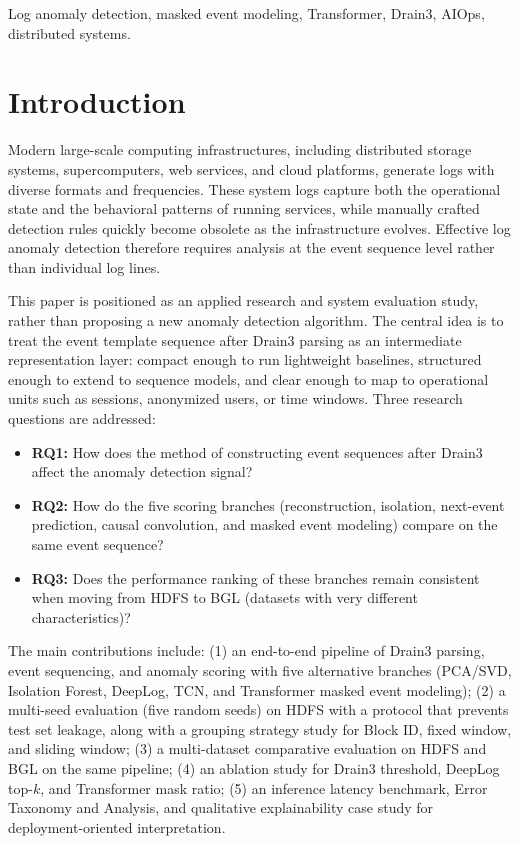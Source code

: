\documentclass[conference]{IEEEtran}
\begin{document}
\begin{IEEEkeywords}
Log anomaly detection, masked event modeling, Transformer, Drain3, AIOps, distributed systems.
\end{IEEEkeywords}

\section{Introduction}
Modern large-scale computing infrastructures, including distributed storage systems, supercomputers, web services, and cloud platforms, generate logs with diverse formats and frequencies. These system logs capture both the operational state and the behavioral patterns of running services, while manually crafted detection rules quickly become obsolete as the infrastructure evolves. Effective log anomaly detection therefore requires analysis at the event sequence level rather than individual log lines.

This paper is positioned as an applied research and system evaluation study, rather than proposing a new anomaly detection algorithm. The central idea is to treat the event template sequence after Drain3 parsing as an intermediate representation layer: compact enough to run lightweight baselines, structured enough to extend to sequence models, and clear enough to map to operational units such as sessions, anonymized users, or time windows. Three research questions are addressed:
\begin{itemize}
    \item \textbf{RQ1:} How does the method of constructing event sequences after Drain3 affect the anomaly detection signal?
    \item \textbf{RQ2:} How do the five scoring branches (reconstruction, isolation, next-event prediction, causal convolution, and masked event modeling) compare on the same event sequence?
    \item \textbf{RQ3:} Does the performance ranking of these branches remain consistent when moving from HDFS to BGL (datasets with very different characteristics)?
\end{itemize}

The main contributions include: (1) an end-to-end pipeline of Drain3 parsing, event sequencing, and anomaly scoring with five alternative branches (PCA/SVD, Isolation Forest, DeepLog, TCN, and Transformer masked event modeling); (2) a multi-seed evaluation (five random seeds) on HDFS with a protocol that prevents test set leakage, along with a grouping strategy study for Block ID, fixed window, and sliding window; (3) a multi-dataset comparative evaluation on HDFS and BGL on the same pipeline; (4) an ablation study for Drain3 threshold, DeepLog top-$k$, and Transformer mask ratio; (5) an inference latency benchmark, Error Taxonomy and Analysis, and qualitative explainability case study for deployment-oriented interpretation.
\end{document}
